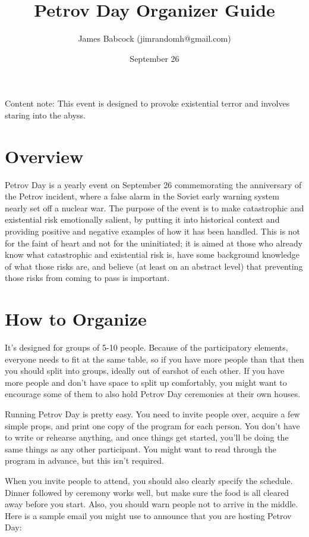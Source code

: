 \documentclass{article}
\title{Petrov Day Organizer Guide}
\author{James Babcock (jimrandomh@gmail.com)}
\date{September 26}
\begin{document}
\maketitle

Content note: This event is designed to provoke existential terror and involves
staring into the abyss.

\section{Overview}

Petrov Day is a yearly event on September 26 commemorating the anniversary of
the Petrov incident, where a false alarm in the Soviet early warning system
nearly set off a nuclear war. The purpose of the event is to make catastrophic
and existential risk emotionally salient, by putting it into historical context
and providing positive and negative examples of how it has been handled. This
is not for the faint of heart and not for the uninitiated; it is aimed at those
who already know what catastrophic and existential risk is, have some
background knowledge of what those risks are, and believe (at least on an
abstract level) that preventing those risks from coming to pass is important.

\section{How to Organize}

It's designed for groups of 5-10 people. Because of the participatory elements,
everyone needs to fit at the same table, so if you have more people than that
then you should split into groups, ideally out of earshot of each other. If you
have more people and don't have space to split up comfortably, you might want
to encourage some of them to also hold Petrov Day ceremonies at their own
houses.

Running Petrov Day is pretty easy. You need to invite people over, acquire a
few simple props, and print one copy of the program for each person. You don't
have to write or rehearse anything, and once things get started, you'll be
doing the same things as any other participant. You might want to read through
the program in advance, but this isn't required.

When you invite people to attend, you should also clearly specify the schedule.
Dinner followed by ceremony works well, but make sure the food is all cleared
away before you start. Also, you should warn people not to arrive in the middle.
Here is a sample email you might use to announce that you are hosting Petrov
Day:
\end{document}
